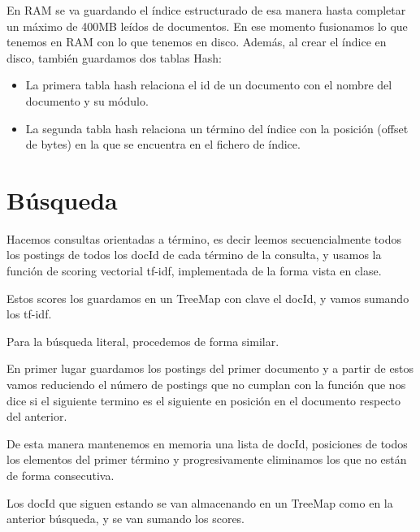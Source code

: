 \documentclass[palatino,nochap]{apuntes}
\begin{document}
En RAM se va guardando el índice estructurado de esa manera hasta completar un máximo de 400MB leídos de documentos. En ese momento fusionamos lo que tenemos en RAM con lo que tenemos en disco. Además, al crear el índice en disco, también guardamos dos tablas Hash:
\begin{itemize}
	\item La primera tabla hash relaciona el id de un documento con el nombre del documento y su módulo.
	\item La segunda tabla hash relaciona un término del índice con la posición (offset de bytes) en la que se encuentra en el fichero de índice.
\end{itemize}


\section{Búsqueda}
Hacemos consultas orientadas a término, es decir leemos secuencialmente todos los postings de todos los docId de cada término de la consulta, y usamos la función de scoring vectorial tf-idf, implementada de la forma vista en clase.

Estos scores los guardamos en un TreeMap con clave el docId, y vamos sumando los tf-idf.

Para la búsqueda literal, procedemos de forma similar.

En primer lugar guardamos los postings del primer documento y a partir de estos vamos reduciendo el número de postings que no cumplan con la función que nos dice si el siguiente termino es el siguiente en posición en el documento respecto del anterior.

De esta manera mantenemos en memoria una lista de docId, posiciones de todos los elementos del primer término y progresivamente eliminamos los que no están de forma consecutiva.

Los docId que siguen estando se van almacenando en un TreeMap como en la anterior búsqueda, y se van sumando los scores.
\end{document}
